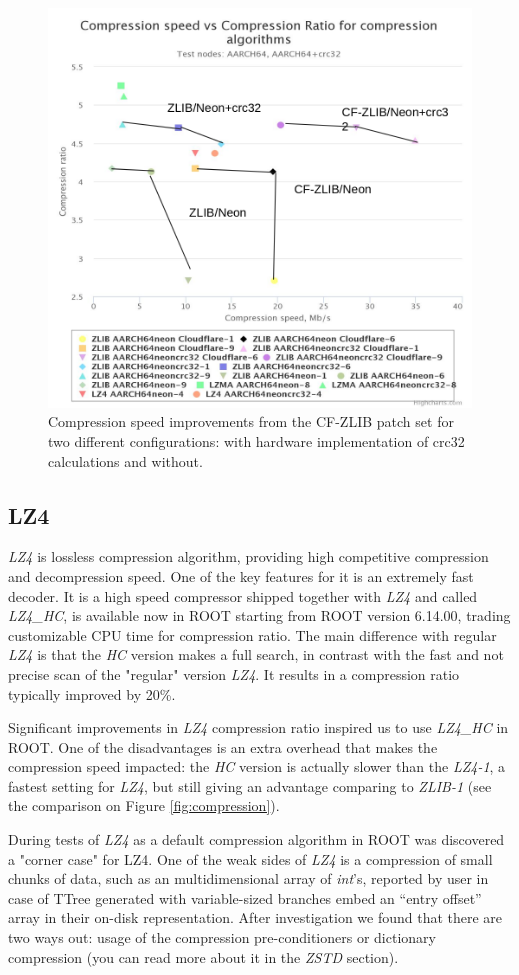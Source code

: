 \documentclass[12pt]{iopart}
\begin{document}
\begin{figure}[!ht]
\centering
\includegraphics[width=0.7\linewidth]{acat31.png}
\caption{Compression speed improvements from the CF-ZLIB patch set for two different configurations: with hardware implementation of crc32 calculations and without.}
\label{fig:cfneon}
\end{figure}

\subsection{LZ4}

\textit{LZ4} is lossless compression algorithm, providing high competitive compression and decompression speed. One of the key features for it is an extremely fast decoder. It is a high speed compressor shipped together with \textit{LZ4} and called \textit{LZ4\_HC}, is available now in ROOT starting from ROOT version 6.14.00, trading customizable CPU time for compression ratio. The main difference with regular \textit{LZ4} is that the \textit{HC} version makes a full search, in contrast with the fast and not precise scan of the "regular" version \textit{LZ4}. It results in a compression ratio typically improved by 20\%. 

Significant improvements in \textit{LZ4} compression ratio inspired us to use \textit{LZ4\_HC} in ROOT. One of the disadvantages is an extra overhead that makes the compression speed impacted: the \textit{HC} version is actually slower than the \textit{LZ4-1}, a fastest setting for \textit{LZ4}, but still giving an advantage comparing to \textit{ZLIB-1} (see the comparison on Figure \ref{fig:compression}).

During tests of \textit{LZ4} as a default compression algorithm in ROOT was discovered a "corner case" for LZ4. One of the weak sides of \textit{LZ4} is a compression of small chunks of data, such as an multidimensional array of \textit{int}'s, reported by user in case of TTree generated with variable-sized branches embed an “entry offset” array in their on-disk representation. After investigation we found that there are two ways out: usage of the compression pre-conditioners or dictionary compression (you can read more about it in the \textit{ZSTD} section). 
\end{document}
